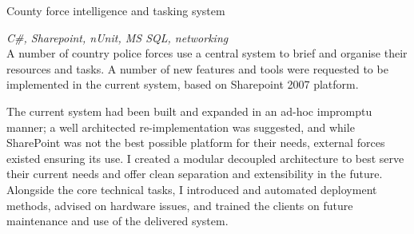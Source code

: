 \documentclass[]{friggeri-cv} %
\begin{document}
\begin{entrylist}
\projectentry
{County force intelligence and tasking system}
{\emph{C\#, Sharepoint, nUnit, MS SQL, networking} \\
A number of country police forces use a central system to brief and organise their resources and tasks. A number of new features and tools were requested to be implemented in the current system, based on Sharepoint 2007 platform.

The current system had been built and expanded in an ad-hoc impromptu manner; a well architected re-implementation was suggested, and while SharePoint was not the best possible platform for their needs, external forces existed ensuring its use. I created a modular decoupled architecture to best serve their current needs and offer clean separation and extensibility in the future. Alongside the core technical tasks, I introduced and automated deployment methods, advised on hardware issues, and trained the clients on future maintenance and use of the delivered system.}
\end{entrylist}







\end{document}
